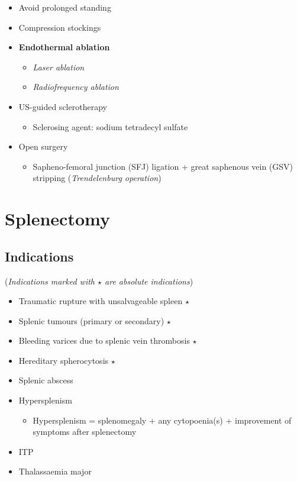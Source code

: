 \documentclass[
  14pt,
]{memoir}
\providecommand{\tightlist}{%
  \setlength{\itemsep}{0pt}\setlength{\parskip}{0pt}}
\begin{document}
\begin{itemize}
\tightlist
\item
  Avoid prolonged standing
\item
  Compression stockings
\item
  \textbf{Endothermal ablation}

  \begin{itemize}
  \tightlist
  \item
    \emph{Laser ablation}
  \item
    \emph{Radiofrequency ablation}
  \end{itemize}
\item
  US-guided sclerotherapy

  \begin{itemize}
  \tightlist
  \item
    Sclerosing agent: sodium tetradecyl sulfate
  \end{itemize}
\item
  Open surgery

  \begin{itemize}
  \tightlist
  \item
    Sapheno-femoral junction (SFJ) ligation + great saphenous vein (GSV)
    stripping (\emph{Trendelenburg operation})
  \end{itemize}
\end{itemize}

\pagebreak

\hypertarget{splenectomy}{%
\chapter{Splenectomy}\label{splenectomy}}

\hypertarget{indications-2}{%
\section{Indications}\label{indications-2}}

(\emph{Indications marked with \(\star\) are absolute indications})

\begin{itemize}
\tightlist
\item
  Traumatic rupture with unsalvageable spleen \(\star\)
\item
  Splenic tumours (primary or secondary) \(\star\)
\item
  Bleeding varices due to splenic vein thrombosis \(\star\)
\item
  Hereditary spherocytosis \(\star\)
\item
  Splenic abscess
\item
  Hypersplenism

  \begin{itemize}
  \tightlist
  \item
    Hypersplenism = splenomegaly + any cytopoenia(s) + improvement of
    symptoms after splenectomy
  \end{itemize}
\item
  ITP
\item
  Thalassaemia major
\end{itemize}
\end{document}

